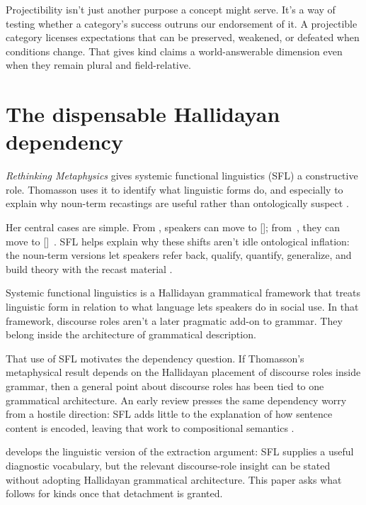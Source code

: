 \documentclass[12pt]{article}
\begin{document}
Projectibility isn't just another purpose a concept might serve. It's a way of testing whether a category's success outruns our endorsement of it. A projectible category licenses expectations that can be preserved, weakened, or defeated when conditions change. That gives kind claims a world-answerable dimension even when they remain plural and field-relative.

\section{The dispensable Hallidayan dependency}

\emph{Rethinking Metaphysics} gives systemic functional linguistics (SFL) a constructive role. Thomasson uses it to identify what linguistic forms do, and especially to explain why noun-term recastings are useful rather than ontologically suspect \citep[133--160]{thomasson2025rethink}.

Her central cases are simple. From , speakers can move to  []; from\ , they can move to []\ . SFL helps explain why these shifts aren't idle ontological inflation: the noun-term versions let speakers refer back, qualify, quantify, generalize, and build theory with the recast material \citep[154--156, 169--179]{thomasson2025rethink}.

Systemic functional linguistics is a Hallidayan grammatical framework that treats linguistic form in relation to what language lets speakers do in social use. In that framework, discourse roles aren't a later pragmatic add-on to grammar. They belong inside the architecture of grammatical description.

That use of SFL motivates the dependency question. If Thomasson's metaphysical result depends on the Hallidayan placement of discourse roles inside grammar, then a general point about discourse roles has been tied to one grammatical architecture. An early review presses the same dependency worry from a hostile direction: SFL adds little to the explanation of how sentence content is encoded, leaving that work to compositional semantics \citep{williamson2026rethinking}.

\textcite{reynolds2026thomassonSFLReview} develops the linguistic version of the extraction argument: SFL supplies a useful diagnostic vocabulary, but the relevant discourse-role insight can be stated without adopting Hallidayan grammatical architecture. This paper asks what follows for kinds once that detachment is granted.
\end{document}
